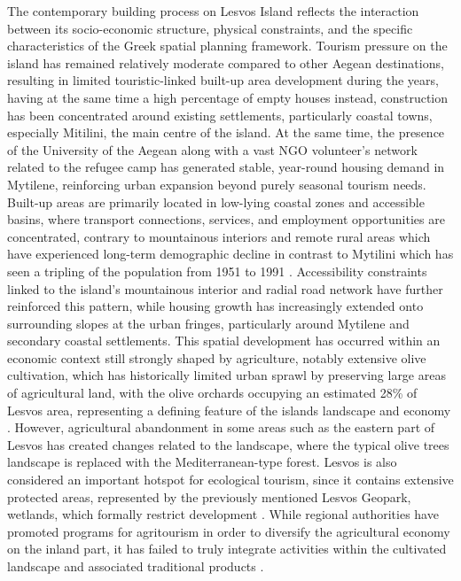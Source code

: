 \documentclass[10pt, twocolumn, twoside]{article}
\begin{document}
The contemporary building process on Lesvos Island reflects the interaction between its socio-economic structure, physical constraints, and the specific characteristics of the Greek spatial planning framework. Tourism pressure on the island has remained relatively moderate compared to other Aegean destinations, resulting in limited touristic-linked built-up area development during the years, having at the same time a high percentage of empty houses \cite{Kizos2017BuiltUpIslands} instead, construction has been concentrated around existing settlements, particularly coastal towns, especially Mitilini, the main centre of the island. At the same time, the presence of the University of the Aegean along with a vast NGO volunteer’s network related to the refugee camp has generated stable, year-round housing demand in Mytilene, reinforcing urban expansion beyond purely seasonal tourism needs. \\
Built-up areas are primarily located in low-lying coastal zones and accessible basins, where transport connections, services, and employment opportunities are concentrated, contrary to mountainous interiors and remote rural areas which have experienced long-term demographic decline in contrast to Mytilini which has seen a tripling of the population from 1951 to 1991 \cite{KIZOS2006330}. Accessibility constraints linked to the island’s mountainous interior and radial road network have further reinforced this pattern, while housing growth has increasingly extended onto surrounding slopes at the urban fringes, particularly around Mytilene and secondary coastal settlements.
This spatial development has occurred within an economic context still strongly shaped by agriculture, notably extensive olive cultivation, which has historically limited urban sprawl by preserving large areas of agricultural land, with the olive orchards occupying an estimated 28\% of Lesvos area, representing a defining feature of the islands landscape and economy \cite{DOUMA201665}. However, agricultural abandonment in some areas such as the eastern part of Lesvos has created changes related to the landscape, where the typical olive trees landscape is replaced with the Mediterranean-type forest. Lesvos is also considered an important hotspot for ecological tourism, since it contains extensive protected areas, represented by the previously mentioned Lesvos Geopark, wetlands, which formally restrict development \cite{Zagaria2018Lesvos} . While regional authorities have promoted programs for agritourism in order to diversify the agricultural economy on the inland part, it has failed to truly integrate activities within the cultivated landscape and associated traditional products .\\
\end{document}
